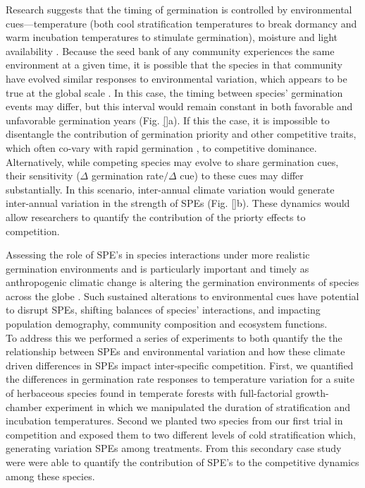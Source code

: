 \documentclass[11pt]{article}\usepackage[]{graphicx}\usepackage[]{color}
\begin{document}
\noindent Research suggests that the timing of germination is controlled by environmental cues---temperature (both cool stratification temperatures to break dormancy and warm incubation temperatures to stimulate germination), moisture and light availability \citep{Bewley1997,Fenner2000}. Because the seed bank of any community experiences the same environment at a given time, it is possible that the species in that community have evolved similar responses to environmental variation, which appears to be true at the global scale \citep{Rubio-de-Casas:2017aa}. In this case, the timing between species' germination events may differ, but this interval would remain constant in both favorable and unfavorable germination years (Fig. \ref{}a). If this the case, it is impossible to disentangle the contribution of germination priority and other competitive traits, which often co-vary with rapid germination \citep{Dickson2012}, to competitive dominance.\\ 

\noindent Alternatively, while competing species may evolve to share germination cues, their sensitivity ($\Delta$ germination rate$/\Delta$ cue) to these cues may differ substantially. In this scenario, inter-annual climate variation would generate inter-annual variation in the strength of SPEs (Fig. \ref{}b). These dynamics would allow researchers to quantify the contribution of the priorty effects to competition. %

\noindent Assessing the role of SPE's in species interactions under more realistic germination environments and is particularly important and timely as anthropogenic climatic change is altering the germination environments of species across the globe \citep{Walck2011}.  Such sustained alterations to environmental cues have potential to disrupt SPEs, shifting balances of species' interactions, and impacting population demography, community composition and ecosystem functions.\\ 

\noindent To address this we performed a series of experiments to both quantify the the relationship between SPEs and environmental variation and how these climate driven differences in SPEs impact inter-specific competition. First, we quantified the differences in germination rate responses to temperature variation for a suite of herbaceous species found in temperate forests with full-factorial growth-chamber experiment in which we manipulated the duration of stratification and incubation temperatures. Second we planted two species from our first trial in competition and exposed them to two different levels of cold stratification which, generating variation SPEs among treatments. From this secondary case study were were able to quantify the contribution of SPE's to the competitive dynamics among these species.
\end{document}
